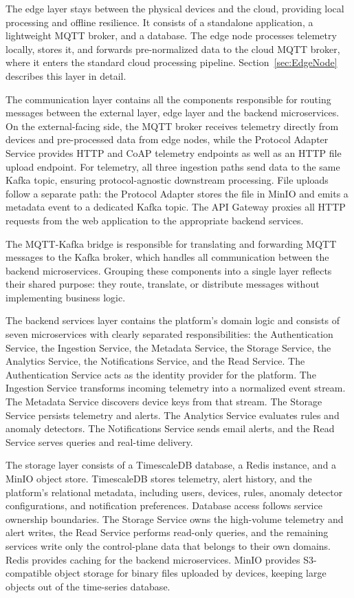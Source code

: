The edge layer stays between the physical devices and the cloud, providing local processing and offline resilience. It consists of a standalone application, a lightweight \gls{MQTT} broker, and a database. The edge node processes telemetry locally, stores it, and forwards pre-normalized data to the cloud \gls{MQTT} broker, where it enters the standard cloud processing pipeline. Section~\ref{sec:EdgeNode} describes this layer in detail.

The communication layer contains all the components responsible for routing messages between the external layer, edge layer and the backend microservices. On the external-facing side, the \gls{MQTT} broker receives telemetry directly from devices and pre-processed data from edge nodes, while the Protocol Adapter Service provides \gls{HTTP} and \gls{CoAP} telemetry endpoints as well as an \gls{HTTP} file upload endpoint. For telemetry, all three ingestion paths send data to the same Kafka topic, ensuring protocol-agnostic downstream processing. File uploads follow a separate path: the Protocol Adapter stores the file in MinIO and emits a metadata event to a dedicated Kafka topic. The \gls{API} Gateway proxies all \gls{HTTP} requests from the web application to the appropriate backend services.

The \gls{MQTT}-Kafka bridge is responsible for translating and forwarding \gls{MQTT} messages to the Kafka broker, which handles all communication between the backend microservices. Grouping these components into a single layer reflects their shared purpose: they route, translate, or distribute messages without implementing business logic.

The backend services layer contains the platform's domain logic and consists of seven microservices with clearly separated responsibilities: the Authentication Service, the Ingestion Service, the Metadata Service, the Storage Service, the Analytics Service, the Notifications Service, and the Read Service. The Authentication Service acts as the identity provider for the platform. The Ingestion Service transforms incoming telemetry into a normalized event stream. The Metadata Service discovers device keys from that stream. The Storage Service persists telemetry and alerts. The Analytics Service evaluates rules and anomaly detectors. The Notifications Service sends email alerts, and the Read Service serves queries and real-time delivery.

The storage layer consists of a TimescaleDB database, a Redis instance, and a MinIO object store. TimescaleDB stores telemetry, alert history, and the platform's relational metadata, including users, devices, rules, anomaly detector configurations, and notification preferences. Database access follows service ownership boundaries. The Storage Service owns the high-volume telemetry and alert writes, the Read Service performs read-only queries, and the remaining services write only the control-plane data that belongs to their own domains. Redis provides caching for the backend microservices. MinIO provides S3-compatible object storage for binary files uploaded by devices, keeping large objects out of the time-series database.

